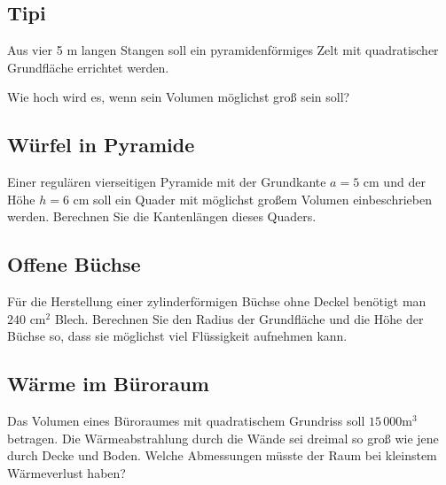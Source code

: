 
\subsection{Tipi}

Aus vier 5 m langen Stangen soll ein
pyramidenförmiges Zelt mit quadratischer Grundfläche errichtet werden.

Wie hoch wird es, wenn sein Volumen möglichst groß sein soll?



\subsection{Würfel in Pyramide}
Einer regulären vierseitigen Pyramide mit der Grundkante $a = 5$ cm und der Höhe $h = 6$ cm
soll ein Quader mit möglichst großem Volumen einbeschrieben werden.
Berechnen Sie die Kantenlängen dieses Quaders.


\subsection{Offene Büchse}
Für die Herstellung einer zylinderförmigen Büchse ohne Deckel benötigt
man $240 \text{ cm}^2$ Blech. Berechnen Sie den Radius der Grundfläche und die Höhe der Büchse so, dass sie möglichst viel Flüssigkeit aufnehmen kann.





\subsection{Wärme im Büroraum}

Das Volumen eines Büroraumes mit quadratischem Grundriss soll $15\,000 \text{m}^3$ betragen. Die Wärmeabstrahlung durch die Wände sei dreimal so groß wie jene durch Decke und Boden. Welche Abmessungen müsste der Raum bei kleinstem Wärmeverlust haben?

